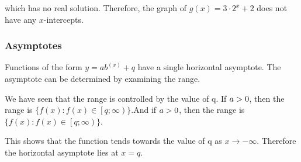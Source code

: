           \label{m39348*id252323}which has no real solution. Therefore, the graph of $g\left(x\right)=3\ensuremath{\cdot}{2}^{x}+2$ does not have any $x$-intercepts.\par 
        \label{m39348*uid191}
            \subsubsection{ Asymptotes}
            \nopagebreak
            \label{m39348*id252384}Functions of the form $y=a{b}^{\left(x\right)}+q$ have a single horizontal asymptote. The asymptote can be determined by examining the range.\par 
          \label{m39348*id252423}We have seen that the range is controlled by the value of q. If $a>{}0$, then the range is $\{f\left(x\right):f\left(x\right)\in \left[q;\infty \right)\}$.And if $a>{}0$, then the range is $\{f\left(x\right):f\left(x\right)\in \left[q;\infty \right)\}$.\par 
\label{m39348*id7623}This shows that the function tends towards the value of q as $x\to -\infty $. Therefore the horizontal asymptote lies at $x=q$.
\par 
        \label{m39348*uid192}
